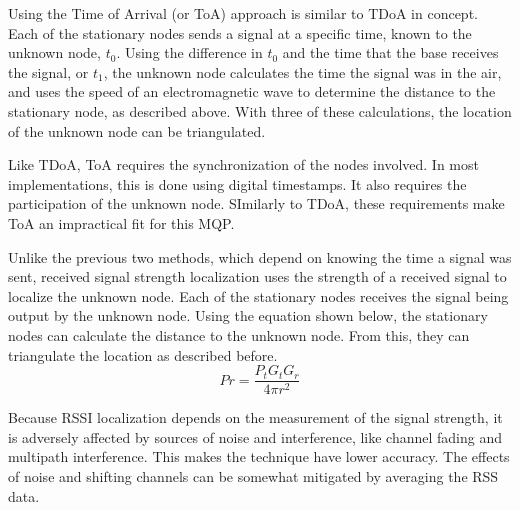 Using the Time of Arrival (or ToA) approach is similar to TDoA in concept\cite{local_conf}. Each of the stationary nodes sends a signal at a specific time, known to the unknown node, $t_0$. Using the difference in $t_0$ and the time that the base receives the signal, or $t_1$, the unknown node calculates the time the signal was in the air, and uses the speed of an electromagnetic wave to determine the distance to the stationary node, as described above. With three of these calculations, the location of the unknown node can be triangulated.\par
Like TDoA, ToA requires the synchronization of the nodes involved\cite{local_conf}. In most implementations, this is done using digital timestamps. It also requires the participation of the unknown node. SImilarly to TDoA, these requirements make ToA an impractical fit for this MQP.

Unlike the previous two methods, which depend on knowing the time a signal was sent, received signal strength localization uses the strength of a received signal to localize the unknown node\cite{local_conf}. Each of the stationary nodes receives the signal being output by the unknown node. Using the equation shown below\cite{rss_calc}, the stationary nodes can calculate the distance to the unknown node. From this, they can triangulate the location as described before.
\[Pr = \frac{P_t G_t G_r}{4πr^2} \]\par
Because RSSI localization depends on the measurement of the signal strength, it is adversely affected by sources of noise and interference, like channel fading and multipath interference\cite{local_conf}. This makes the technique have lower accuracy. The effects of noise and shifting channels can be somewhat mitigated by averaging the RSS data.

